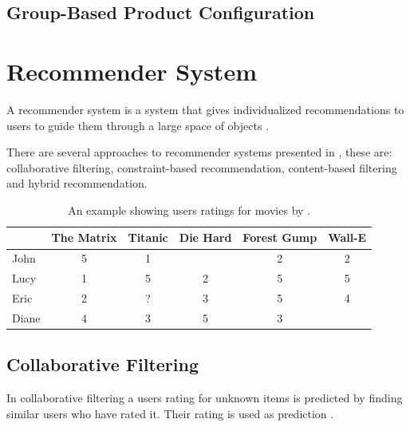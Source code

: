 \subsection{Group-Based Product Configuration}
\label{sec:Foundations:GroupBasedProductConfiguration}



\section{Recommender System}
\label{sec:Foundations:RecommenderSystem}

A recommender system is a system that gives individualized recommendations to users to guide them through a large space of objects \cite[~ p. 331]{burkeHybridRecommenderSystems2002}.

There are several approaches to recommender systems presented in \cite{felfernigGroupRecommenderSystems2018}, these are: collaborative filtering,  constraint-based recommendation, content-based filtering and hybrid recommendation.

\begin{table}
    \centering    
    \begin{tabular}{ l | c | c | c | c | c }
        & The Matrix & Titanic & Die Hard & Forest Gump & Wall-E \\ \hline
         John  & 5 & 1 &   & 2 & 2 \\
         Lucy  & 1 & 5 & 2 & 5 & 5 \\
         Eric  & 2 & ? & 3 & 5 & 4 \\
         Diane & 4 & 3 & 5 & 3 &   \\
    \end{tabular}
    \caption{An example showing users ratings for movies by \citeauthor{ningComprehensiveSurveyNeighborhoodBased2015} \cite{ningComprehensiveSurveyNeighborhoodBased2015}.}
    
    \label{tab:Foundations:RecommenderSystem:MoviePreferences}
\end{table}

\subsection{Collaborative Filtering}
In collaborative filtering a users rating for unknown items is predicted by finding similar users who have rated it. Their rating is used as prediction
\cite[~ pp. 7, 8]{felfernigDecisionTasksBasic2018}.

